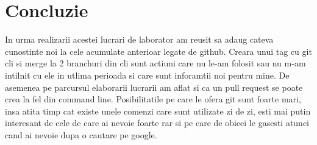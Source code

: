 \section*{Concluzie}

In urma realizarii acestei lucrari de laborator am reusit sa adaug cateva cunostinte noi la cele acumulate anterioar legate de github. Creara unui tag cu git cli si merge la 2 branchuri din cli sunt actiuni care nu le-am folosit sau nu m-am intilnit cu ele in utlima perioada si care sunt inforamtii  noi pentru mine. De asemenea pe parcursul elaborarii lucrarii am aflat si ca un pull request se poate crea la fel din command line. Posibilitatile pe care le ofera git sunt foarte mari, insa atita timp cat existe unele comenzi care sunt utilizate zi de zi, esti mai putin interesant de cele de care ai nevoie foarte rar si pe care de obicei le gasesti atunci cand ai nevoie dupa o cautare pe google.

\clearpage